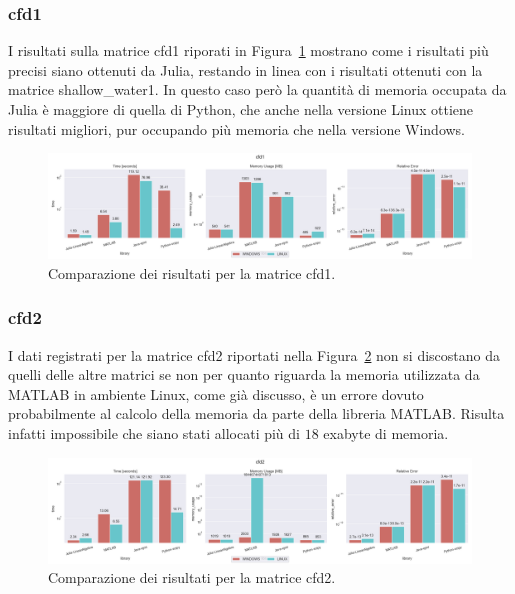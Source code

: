 \documentclass[a4paper, 12pt]{article}
\begin{document}
\subsubsection{cfd1}
I risultati sulla matrice cfd1 riporati in Figura~\ref{fig:cfd1} mostrano come i
risultati più precisi siano ottenuti da Julia, restando in linea con i risultati
ottenuti con la matrice shallow\_water1. In questo caso però la quantità di
memoria occupata da Julia è maggiore di quella di Python, che anche nella
versione Linux ottiene risultati migliori, pur occupando più memoria che nella
versione Windows.
\begin{figure}[ht]
\includegraphics[width=\textwidth]{cfd1}
\caption{Comparazione dei risultati per la matrice cfd1.}
\label{fig:cfd1}
\end{figure}
\subsubsection{cfd2}
I dati registrati per la matrice cfd2 riportati nella Figura~\ref{fig:cfd2} non
si discostano da quelli delle altre matrici se non per quanto riguarda la
memoria utilizzata da MATLAB in ambiente Linux, come già discusso, è un errore
dovuto probabilmente al calcolo della memoria da parte della libreria MATLAB.
Risulta infatti impossibile che siano stati allocati più di $18$ exabyte di
memoria.
\begin{figure}[ht]
\includegraphics[width=\textwidth]{cfd2}
\caption{Comparazione dei risultati per la matrice cfd2.}
\label{fig:cfd2}
\end{figure}
\end{document}
